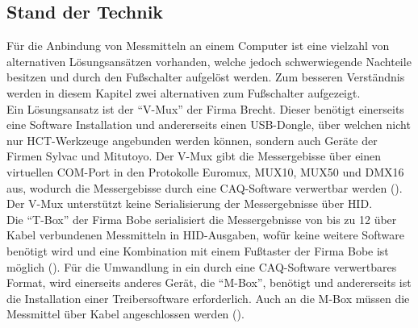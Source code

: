 \subsection{Stand der Technik}
Für die Anbindung von Messmitteln an einem Computer ist eine vielzahl von alternativen Lösungsansätzen vorhanden, welche jedoch schwerwiegende Nachteile besitzen und durch den Fußschalter aufgelöst werden. Zum besseren Verständnis werden in diesem Kapitel zwei alternativen zum Fußschalter aufgezeigt.\\
Ein Lösungsansatz ist der ``V-Mux'' der Firma Brecht. Dieser benötigt einerseits eine Software Installation und andererseits einen USB-Dongle, über welchen nicht nur \ac{HCT}-Werkzeuge angebunden werden können, sondern auch Geräte der Firmen Sylvac und Mitutoyo. Der V-Mux gibt die Messergebisse über einen virtuellen COM-Port in den Protokolle Euromux, MUX10, MUX50 und DMX16 aus, wodurch die Messergebisse durch eine \ac{CAQ}-Software verwertbar werden (\cite[5]{VMUX}). Der V-Mux unterstützt keine Serialisierung der Messergebnisse über \ac{HID}.\\
Die ``T-Box'' der Firma Bobe serialisiert die Messergebnisse von bis zu 12 über Kabel verbundenen Messmitteln in \ac{HID}-Ausgaben, wofür keine weitere Software benötigt wird und eine Kombination mit einem Fußtaster der Firma Bobe ist möglich (\cite{TBOX-Bobe}). Für die Umwandlung in ein durch eine \ac{CAQ}-Software verwertbares Format, wird einerseits anderes Gerät, die ``M-Box'', benötigt und andererseits ist die Installation einer Treibersoftware erforderlich. Auch an die M-Box müssen die Messmittel über Kabel angeschlossen werden (\cite{MBOX-Bobe}).